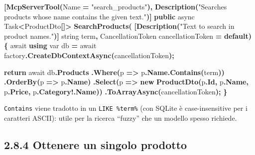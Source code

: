 \documentclass[
  italian,
  10pt,
]{book}
\newenvironment{Shaded}{\begin{snugshade}}{\end{snugshade}}
\newcommand{\DataTypeTok}[1]{\textcolor[rgb]{0.13,0.29,0.53}{#1}}
\newcommand{\FunctionTok}[1]{\textcolor[rgb]{0.13,0.29,0.53}{\textbf{#1}}}
\newcommand{\KeywordTok}[1]{\textcolor[rgb]{0.13,0.29,0.53}{\textbf{#1}}}
\newcommand{\NormalTok}[1]{#1}
\newcommand{\OperatorTok}[1]{\textcolor[rgb]{0.81,0.36,0.00}{\textbf{#1}}}
\newcommand{\StringTok}[1]{\textcolor[rgb]{0.31,0.60,0.02}{#1}}
\begin{document}
\begin{Shaded}
\begin{Highlighting}[]
\OperatorTok{[}\FunctionTok{McpServerTool}\OperatorTok{(}\NormalTok{Name }\OperatorTok{=} \StringTok{"search\_products"}\OperatorTok{),} \FunctionTok{Description}\OperatorTok{(}\StringTok{"Searches products whose name contains the given text."}\OperatorTok{)]}
\KeywordTok{public}\NormalTok{ async Task}\OperatorTok{\textless{}}\NormalTok{ProductDto}\OperatorTok{[]\textgreater{}} \FunctionTok{SearchProducts}\OperatorTok{(}
    \OperatorTok{[}\FunctionTok{Description}\OperatorTok{(}\StringTok{"Text to search in product names."}\OperatorTok{)]} \DataTypeTok{string}\NormalTok{ term}\OperatorTok{,}
\NormalTok{    CancellationToken cancellationToken }\OperatorTok{=} \KeywordTok{default}\OperatorTok{)}
\OperatorTok{\{}
\NormalTok{    await }\KeywordTok{using} \DataTypeTok{var}\NormalTok{ db }\OperatorTok{=}\NormalTok{ await factory}\OperatorTok{.}\FunctionTok{CreateDbContextAsync}\OperatorTok{(}\NormalTok{cancellationToken}\OperatorTok{);}

    \KeywordTok{return}\NormalTok{ await db}\OperatorTok{.}\FunctionTok{Products}
        \OperatorTok{.}\FunctionTok{Where}\OperatorTok{(}\NormalTok{p }\OperatorTok{=\textgreater{}}\NormalTok{ p}\OperatorTok{.}\FunctionTok{Name}\OperatorTok{.}\FunctionTok{Contains}\OperatorTok{(}\NormalTok{term}\OperatorTok{))}
        \OperatorTok{.}\FunctionTok{OrderBy}\OperatorTok{(}\NormalTok{p }\OperatorTok{=\textgreater{}}\NormalTok{ p}\OperatorTok{.}\FunctionTok{Name}\OperatorTok{)}
        \OperatorTok{.}\FunctionTok{Select}\OperatorTok{(}\NormalTok{p }\OperatorTok{=\textgreater{}} \KeywordTok{new} \FunctionTok{ProductDto}\OperatorTok{(}\NormalTok{p}\OperatorTok{.}\FunctionTok{Id}\OperatorTok{,}\NormalTok{ p}\OperatorTok{.}\FunctionTok{Name}\OperatorTok{,}\NormalTok{ p}\OperatorTok{.}\FunctionTok{Price}\OperatorTok{,}\NormalTok{ p}\OperatorTok{.}\FunctionTok{Category}\OperatorTok{!.}\FunctionTok{Name}\OperatorTok{))}
        \OperatorTok{.}\FunctionTok{ToArrayAsync}\OperatorTok{(}\NormalTok{cancellationToken}\OperatorTok{);}
\OperatorTok{\}}
\end{Highlighting}
\end{Shaded}

\texttt{Contains} viene tradotto in un
\texttt{LIKE\ \textquotesingle{}\%term\%\textquotesingle{}} (con SQLite
è case-insensitive per i caratteri ASCII): utile per la ricerca
``fuzzy'' che un modello spesso richiede.

\subsection{2.8.4 Ottenere un singolo
prodotto}\label{ottenere-un-singolo-prodotto}
\end{document}
